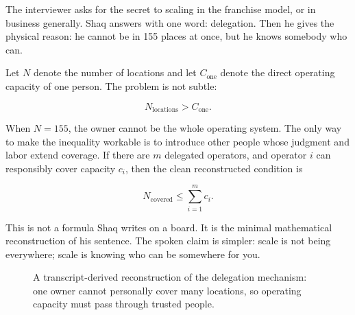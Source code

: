 The interviewer asks for the secret to scaling in the franchise model, or in business generally. Shaq answers with one word: delegation. Then he gives the physical reason: he cannot be in 155 places at once, but he knows somebody who can.

Let \(N\) denote the number of locations and let \(C_{\mathrm{one}}\) denote the direct operating capacity of one person. The problem is not subtle:

\begin{equation}
N_{\mathrm{locations}} > C_{\mathrm{one}}.
\end{equation}

When \(N=155\), the owner cannot be the whole operating system. The only way to make the inequality workable is to introduce other people whose judgment and labor extend coverage. If there are \(m\) delegated operators, and operator \(i\) can responsibly cover capacity \(c_i\), then the clean reconstructed condition is

\begin{equation}
N_{\mathrm{covered}} \leq \sum_{i=1}^{m} c_i.
\end{equation}

This is not a formula Shaq writes on a board. It is the minimal mathematical reconstruction of his sentence. The spoken claim is simpler: scale is not being everywhere; scale is knowing who can be somewhere for you.

\begin{figure}
\centering
{}
\caption{A transcript-derived reconstruction of the delegation mechanism: one owner cannot personally cover many locations, so operating capacity must pass through trusted people.}
\end{figure}

